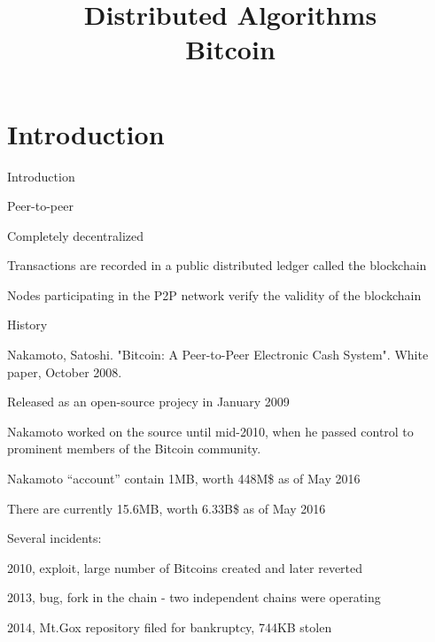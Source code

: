 
\title[DS - Bitcoin]{\textbf{Distributed Algorithms}\\Bitcoin}

\usepackage{ragged2e}
\graphicspath{{figs/19/}}

\def\bitcoin{\leavevmode\rlap{\hskip.5pt-}B\xspace} 



\FrameContent

\section{Introduction}

\begin{frame}{Introduction}
	

\bigskip
{}
\BIL
\item Peer-to-peer
\item Completely decentralized
\item Transactions are recorded in a public distributed ledger called the \alert{blockchain}
\item Nodes participating in the P2P network verify the validity of the
blockchain
\EIL
	
\end{frame}


\begin{frame}{History}
\BIL
\item Nakamoto, Satoshi. "Bitcoin: A Peer-to-Peer Electronic Cash System". White paper, October 2008.
\item Released as an open-source projecy in January 2009
\item Nakamoto worked on the source until mid-2010, when he passed control
to prominent members of the Bitcoin community.
\item Nakamoto “account” contain 1M\bitcoin, worth 448M\$ as of May 2016
\item There are currently 15.6M\bitcoin, worth 6.33B\$ as of May 2016
\item Several incidents:
\BI
\item 2010, exploit, large number of Bitcoins created and later reverted
\item 2013, bug, fork in the chain - two independent chains were operating
\item 2014, Mt.Gox repository filed for bankruptcy, 744K\bitcoin  stolen
\EI
\EIL
\end{frame}



